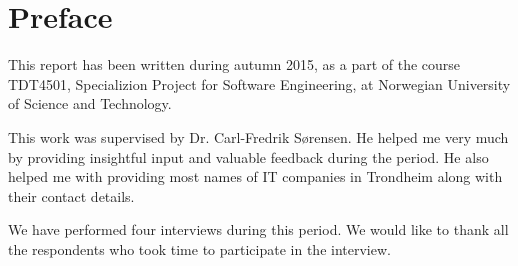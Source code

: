 \section*{Preface}
This report has been written during autumn 2015, as a part of the course TDT4501, Specializion Project for Software Engineering, at Norwegian University of Science and Technology. 

This work was supervised by Dr. Carl-Fredrik Sørensen. He helped me very much by providing insightful input and valuable feedback during the period. He also helped me with providing most names of IT companies in Trondheim along with their contact details.

We have performed four interviews during this period. We would like to thank all the respondents who took time to participate in the interview.